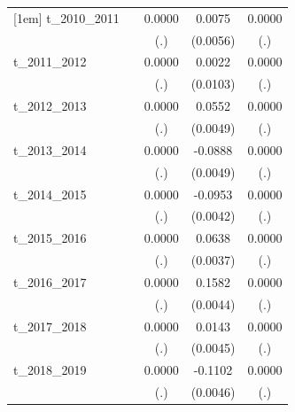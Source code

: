 \begin{table}[htbp]
\begin{tabular}{l*{4}{c}}
[1em]
t\_2010\_2011 &                     &      0.0000         &      0.0075         &      0.0000         \\
            &                     &         (.)         &    (0.0056)         &         (.)         \\
[1em]
t\_2011\_2012 &                     &      0.0000         &      0.0022         &      0.0000         \\
            &                     &         (.)         &    (0.0103)         &         (.)         \\
[1em]
t\_2012\_2013 &                     &      0.0000         &      0.0552\sym{***}&      0.0000         \\
            &                     &         (.)         &    (0.0049)         &         (.)         \\
[1em]
t\_2013\_2014 &                     &      0.0000         &     -0.0888\sym{***}&      0.0000         \\
            &                     &         (.)         &    (0.0049)         &         (.)         \\
[1em]
t\_2014\_2015 &                     &      0.0000         &     -0.0953\sym{***}&      0.0000         \\
            &                     &         (.)         &    (0.0042)         &         (.)         \\
[1em]
t\_2015\_2016 &                     &      0.0000         &      0.0638\sym{***}&      0.0000         \\
            &                     &         (.)         &    (0.0037)         &         (.)         \\
[1em]
t\_2016\_2017 &                     &      0.0000         &      0.1582\sym{***}&      0.0000         \\
            &                     &         (.)         &    (0.0044)         &         (.)         \\
[1em]
t\_2017\_2018 &                     &      0.0000         &      0.0143\sym{***}&      0.0000         \\
            &                     &         (.)         &    (0.0045)         &         (.)         \\
[1em]
t\_2018\_2019 &                     &      0.0000         &     -0.1102\sym{***}&      0.0000         \\
            &                     &         (.)         &    (0.0046)         &         (.)         \\

\end{tabular}
\end{table}

